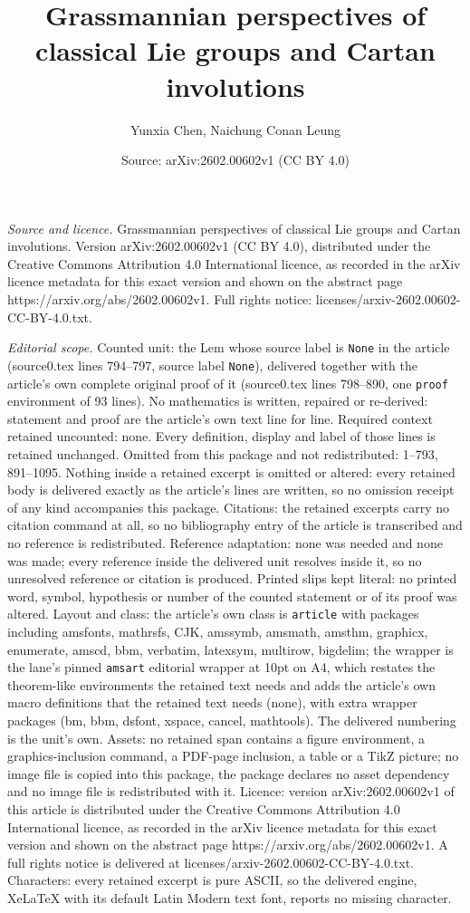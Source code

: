 \documentclass[10pt,a4paper]{amsart}
\title[Grassmannian perspectives of classical Lie groups and Cartan]{Grassmannian perspectives of classical Lie groups and Cartan involutions}
\author{Yunxia Chen, Naichung Conan Leung}
\date{Source: arXiv:2602.00602v1 (CC BY 4.0)}
\begin{document}
\maketitle

\noindent\emph{Source and licence.} Grassmannian perspectives of classical Lie groups and Cartan involutions. Version arXiv:2602.00602v1 (CC BY 4.0), distributed under the Creative Commons Attribution 4.0 International licence, as recorded in the arXiv licence metadata for this exact version and shown on the abstract page https://arxiv.org/abs/2602.00602v1. Full rights notice: licenses/arxiv-2602.00602-CC-BY-4.0.txt.\par\smallskip

\noindent\textit{Editorial scope.} Counted unit: the Lem whose source label is \texttt{None} in the article (source0.tex lines 794--797, source label \texttt{None}), delivered together with the article's own complete original proof of it (source0.tex lines 798--890, one \texttt{proof} environment of 93 lines). No mathematics is written, repaired or re-derived: statement and proof are the article's own text line for line. Required context retained uncounted: none. Every definition, display and label of those lines is retained unchanged. Omitted from this package and not redistributed: 1--793, 891--1095. Nothing inside a retained excerpt is omitted or altered: every retained body is delivered exactly as the article's lines are written, so no omission receipt of any kind accompanies this package. Citations: the retained excerpts carry no citation command at all, so no bibliography entry of the article is transcribed and no reference is redistributed. Reference adaptation: none was needed and none was made; every reference inside the delivered unit resolves inside it, so no unresolved reference or citation is produced. Printed slips kept literal: no printed word, symbol, hypothesis or number of the counted statement or of its proof was altered. Layout and class: the article's own class is \texttt{article} with packages including amsfonts, mathrsfs, CJK, amssymb, amsmath, amsthm, graphicx, enumerate, amscd, bbm, verbatim, latexsym, multirow, bigdelim; the wrapper is the lane's pinned \texttt{amsart} editorial wrapper at 10pt on A4, which restates the theorem-like environments the retained text needs and adds the article's own macro definitions that the retained text needs (none), with extra wrapper packages (bm, bbm, dsfont, xspace, cancel, mathtools). The delivered numbering is the unit's own. Assets: no retained span contains a figure environment, a graphics-inclusion command, a PDF-page inclusion, a table or a TikZ picture; no image file is copied into this package, the package declares no asset dependency and no image file is redistributed with it. Licence: version arXiv:2602.00602v1 of this article is distributed under the Creative Commons Attribution 4.0 International licence, as recorded in the arXiv licence metadata for this exact version and shown on the abstract page https://arxiv.org/abs/2602.00602v1. A full rights notice is delivered at licenses/arxiv-2602.00602-CC-BY-4.0.txt. Characters: every retained excerpt is pure ASCII, so the delivered engine, XeLaTeX with its default Latin Modern text font, reports no missing character.
\end{document}
